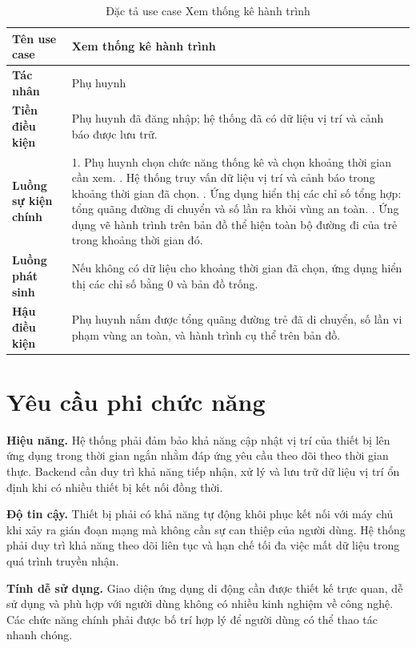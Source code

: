 \documentclass[../DoAn.tex]{subfiles}
\begin{document}
\begin{table}[H]
\centering
\caption{Đặc tả use case Xem thống kê hành trình}
\label{table:uc_stats}
\begin{tabular}{|l|p{9.5cm}|}
\hline
\textbf{Tên use case}       & Xem thống kê hành trình \\
\hline
\textbf{Tác nhân}           & Phụ huynh \\
\hline
\textbf{Tiền điều kiện}     & Phụ huynh đã đăng nhập; hệ thống đã có dữ liệu vị trí và cảnh báo được lưu trữ. \\
\hline
\textbf{Luồng sự kiện chính} &
1. Phụ huynh chọn chức năng thống kê và chọn khoảng thời gian cần xem. \newline
2. Hệ thống truy vấn dữ liệu vị trí và cảnh báo trong khoảng thời gian đã chọn. \newline
3. Ứng dụng hiển thị các chỉ số tổng hợp: tổng quãng đường di chuyển và số lần ra khỏi vùng an toàn. \newline
4. Ứng dụng vẽ hành trình trên bản đồ thể hiện toàn bộ đường đi của trẻ trong khoảng thời gian đó. \\
\hline
\textbf{Luồng phát sinh}    & Nếu không có dữ liệu cho khoảng thời gian đã chọn, ứng dụng hiển thị các chỉ số bằng 0 và bản đồ trống. \\
\hline
\textbf{Hậu điều kiện}      & Phụ huynh nắm được tổng quãng đường trẻ đã di chuyển, số lần vi phạm vùng an toàn, và hành trình cụ thể trên bản đồ. \\
\hline
\end{tabular}
\end{table}

\section{Yêu cầu phi chức năng}
\label{section:2.4}

\textbf{Hiệu năng.} Hệ thống phải đảm bảo khả năng cập nhật vị trí của thiết bị lên ứng dụng trong thời gian ngắn nhằm đáp ứng yêu cầu theo dõi theo thời gian thực. Backend cần duy trì khả năng tiếp nhận, xử lý và lưu trữ dữ liệu vị trí ổn định khi có nhiều thiết bị kết nối đồng thời.

\textbf{Độ tin cậy.} Thiết bị phải có khả năng tự động khôi phục kết nối với máy chủ khi xảy ra gián đoạn mạng mà không cần sự can thiệp của người dùng. Hệ thống phải duy trì khả năng theo dõi liên tục và hạn chế tối đa việc mất dữ liệu trong quá trình truyền nhận.

\textbf{Tính dễ sử dụng.} Giao diện ứng dụng di động cần được thiết kế trực quan, dễ sử dụng và phù hợp với người dùng không có nhiều kinh nghiệm về công nghệ. Các chức năng chính phải được bố trí hợp lý để người dùng có thể thao tác nhanh chóng.
\end{document}
